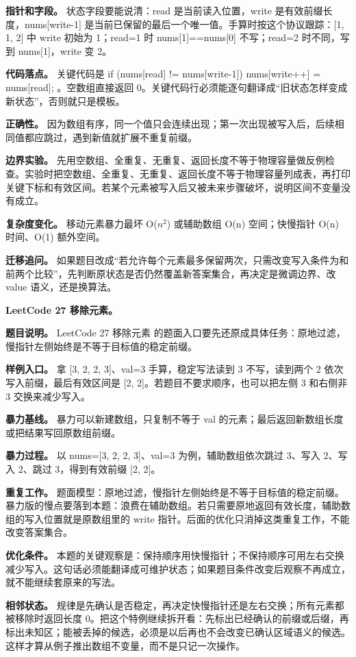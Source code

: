 \textbf{指针和字段。} 状态字段要能说清：read 是当前读入位置，write 是有效前缀长度，nums[write-1] 是当前已保留的最后一个唯一值。手算时按这个协议跟踪：[1, 1, 2] 中 write 初始为 1；read=1 时 nums[1]==nums[0] 不写；read=2 时不同，写到 nums[1]，write 变 2。

\textbf{代码落点。} 关键代码是 if (nums[read] != nums[write-1]) nums[write++] = nums[read]; 。空数组直接返回 0。关键代码行必须能逐句翻译成“旧状态怎样变成新状态”，否则就只是模板。

\textbf{正确性。} 因为数组有序，同一个值只会连续出现；第一次出现被写入后，后续相同值都应跳过，遇到新值就扩展不重复前缀。

\textbf{边界实验。} 先用空数组、全重复、无重复、返回长度不等于物理容量做反例检查。实验时把空数组、全重复、无重复、返回长度不等于物理容量列成表，再打印关键下标和有效区间。若某个元素被写入后又被未来步骤破坏，说明区间不变量没有成立。

\textbf{复杂度变化。} 移动元素暴力最坏 O(\ensuremath{n^{2}}) 或辅助数组 O(n) 空间；快慢指针 O(n) 时间、O(1) 额外空间。

\textbf{迁移追问。} 如果题目改成“若允许每个元素最多保留两次，只需改变写入条件为和前两个比较”，先判断原状态是否仍然覆盖新答案集合，再决定是微调边界、改 value 语义，还是换算法。

\noindent\textbf{LeetCode 27 移除元素。}

\textbf{题目说明。} LeetCode 27 移除元素 的题面入口要先还原成具体任务：原地过滤，慢指针左侧始终是不等于目标值的稳定前缀。

\textbf{样例入口。} 拿 [3, 2, 2, 3]、val=3 手算，稳定写法读到 3 不写，读到两个 2 依次写入前缀，最后有效区间是 [2, 2]。若题目不要求顺序，也可以把左侧 3 和右侧非 3 交换来减少写入。

\textbf{暴力基线。} 暴力可以新建数组，只复制不等于 val 的元素；最后返回新数组长度或把结果写回原数组前缀。

\textbf{暴力过程。} 以 nums=[3, 2, 2, 3]、val=3 为例，辅助数组依次跳过 3、写入 2、写入 2、跳过 3，得到有效前缀 [2, 2]。

\textbf{重复工作。} 题面模型：原地过滤，慢指针左侧始终是不等于目标值的稳定前缀。暴力版的慢点要落到本题：浪费在辅助数组。若只需要原地返回有效长度，辅助数组的写入位置就是原数组里的 write 指针。后面的优化只消掉这类重复工作，不能改变答案集合。

\textbf{优化条件。} 本题的关键观察是：保持顺序用快慢指针；不保持顺序可用左右交换减少写入。这句话必须能翻译成可维护状态；如果题目条件改变后观察不再成立，就不能继续套原来的写法。

\textbf{相邻状态。} 规律是先确认是否稳定，再决定快慢指针还是左右交换；所有元素都被移除时返回长度 0。把这个特例继续拆开看：先标出已经确认的前缀或后缀，再标出未知区；能被丢掉的候选，必须是以后再也不会改变已确认区域语义的候选。这样才算从例子推出数组不变量，而不是只记一次操作。

